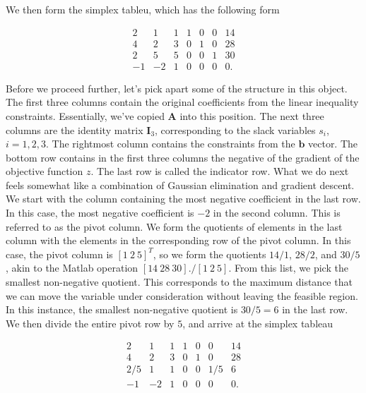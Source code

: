 \documentclass[12pt,english]{article}
\begin{document}
We then form the simplex tableu, which has the following form

\begin{equation}\label{eq:1.3}
\begin{array}{cccccc|c}
2 	&	1	& 	1 	& 	1	& 	0	&	0	&	14 \\
4	&	2	& 	3	&	0	&	1	&	0	&	28 \\
2	&	5	&	5	&	0	&	0	& 	1	& 	30 \\
\hline
-1	& 	-2	&	1	& 	0	&	0	&	0	&	0.
\end{array}
\end{equation}

Before we proceed further, let's pick apart some of the structure in this object.  The first three columns contain the original coefficients from the linear inequality constraints.  Essentially, we've copied $\mathbf{A}$ into this position.  The next three columns are the identity matrix $\mathbf{I}_3$, corresponding to the slack variables $s_i$, $i=1, 2, 3.$  The rightmost column contains the constraints from the $\mathbf{b}$ vector.  The bottom row contains in the first three columns the negative of the gradient of the objective function $z$.  The last row is called the indicator row.   What we do next feels somewhat like a combination of Gaussian elimination and gradient descent.  We start with the column containing the most negative coefficient in the last row.  In this case, the most negative coefficient is $-2$ in the second column.  This is referred to as the pivot column.   We form the quotients of elements in the last column with the elements in the corresponding row of the pivot column.  In this case, the pivot column is $[1 ~2 ~5]^T$, so we form the quotients $14/1$, $28/2$, and $30/5$, akin to the Matlab operation $[14 ~28 ~30]./[1 ~2 ~5]$.  From this list, we pick the smallest non-negative quotient.  This corresponds to the maximum distance that we can move the variable under consideration without leaving the feasible region. In this instance, the smallest non-negative quotient is $30/5 = 6$ in the last row.   We then divide the entire pivot row by $5$, and arrive at the simplex tableau

\begin{equation}
\begin{array}{cccccc|c}
2 	&	1	& 	1 	& 	1	& 	0	&	0	&	14 \\
4	&	2	& 	3	&	0	&	1	&	0	&	28 \\
2/5	&	1	&	1	&	0	&	0	& 	1/5	& 	6  \\
\hline
-1	& 	-2	&	1	& 	0	&	0	&	0	&	0.
\end{array}
\end{equation}
\end{document}
